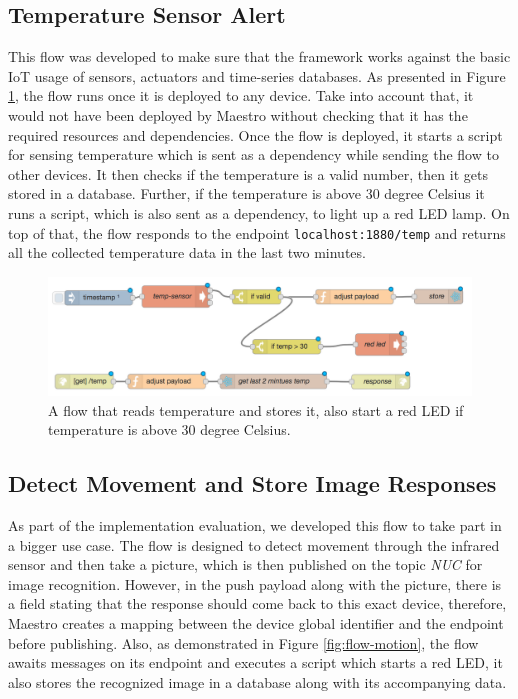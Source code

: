 \subsection{Temperature Sensor Alert}\label{susbec:temp}
This flow was developed to make sure that the  framework works against the basic IoT usage of sensors, actuators and time-series databases. As presented in Figure \ref{fig:flow-temp}, the flow runs once it is deployed to any device. Take into account that, it would not have been deployed by Maestro without checking that it has the required resources and dependencies. Once the flow is deployed, it starts a script for sensing temperature  which is sent as a dependency while sending the flow to other devices. It then checks if the temperature is a valid number, then it gets stored in a database. Further, if the temperature is above 30 degree Celsius it runs a script, which is also sent as a dependency, to light up a red LED lamp. On top of that, the flow responds to the endpoint \verb|localhost:1880/temp| and returns all the collected temperature data in the last two minutes.
 \begin{figure}[H]
	\centering
	\includegraphics[scale=0.6]{images/flow-temp.png}
	\caption{A flow that reads temperature and stores it, also start a red LED if temperature is above 30 degree Celsius.}
	\label{fig:flow-temp}
\end{figure}



\subsection{Detect Movement and Store Image Responses} \label{subsec:detect-move}
As part of the implementation evaluation, we developed this flow to take part in a bigger use case. The flow is designed to detect movement through the infrared sensor and then take a picture, which is then published on the topic \textit{NUC} for image recognition. However, in the push payload along with the picture, there is a field stating that the response should come back to this exact device, therefore, Maestro creates a mapping between the device global identifier and the endpoint before publishing. Also, as demonstrated in Figure \ref{fig:flow-motion}, the flow awaits messages on its endpoint and executes a script which starts a red LED, it also stores the recognized image in a database along with its accompanying data. 

